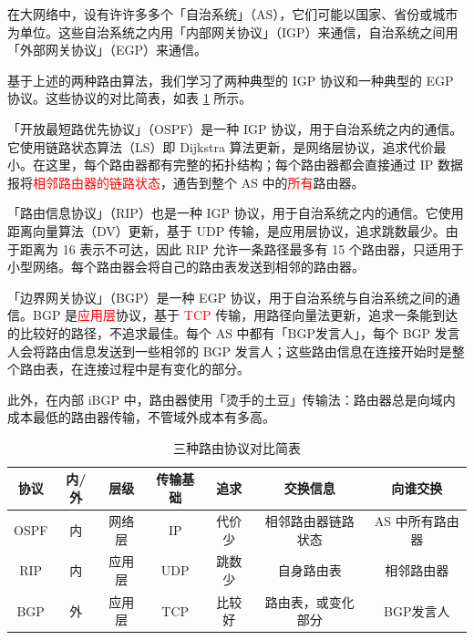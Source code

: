 \documentclass[UTF8]{ctexart}
\newcommand\Concept[1]{\textcolor{cyan!70!black}{#1}}
\begin{document}
在大网络中，设有许许多多个\Concept{「自治系统」（AS）}，它们可能以国家、省份或城市为单位。这些自治系统之内用\Concept{「内部网关协议」（IGP）}来通信，自治系统之间用\Concept{「外部网关协议」（EGP）}来通信。

基于上述的两种路由算法，我们学习了两种典型的 IGP 协议和一种典型的 EGP 协议。这些协议的对比简表，如表 \ref{tab:对比表} 所示。

\begin{description}[itemsep=0pt,parsep=0pt]
  \item[OSPF] \Concept{「开放最短路优先协议」（OSPF）}是一种 IGP 协议，用于自治系统之内的通信。它使用链路状态算法（LS）即 Dijkstra 算法更新，是网络层协议，追求代价最小。在这里，每个路由器都有完整的拓扑结构；每个路由器都会直接通过 IP 数据报将\textcolor{red}{相邻路由器的链路状态}，通告到整个 AS 中的\textcolor{red}{所有}路由器。
  \item[RIP] \Concept{「路由信息协议」（RIP）}也是一种 IGP 协议，用于自治系统之内的通信。它使用距离向量算法（DV）更新，基于 UDP 传输，是应用层协议，追求跳数最少。由于距离为 16 表示不可达，因此 RIP 允许一条路径最多有 15 个路由器，只适用于小型网络。每个路由器会将自己的路由表发送到相邻的路由器。
  \item[BGP] \Concept{「边界网关协议」（BGP）}是一种 EGP 协议，用于自治系统与自治系统之间的通信。BGP 是\textcolor{red}{应用层}协议，基于 \textcolor{red}{TCP} 传输，用路径向量法更新，追求一条能到达的比较好的路径，不追求最佳。每个 AS 中都有「BGP发言人」，每个 BGP 发言人会将路由信息发送到一些相邻的 BGP 发言人；这些路由信息在连接开始时是整个路由表，在连接过程中是有变化的部分。

      此外，在内部 iBGP 中，路由器使用「烫手的土豆」传输法：路由器总是向域内成本最低的路由器传输，不管域外成本有多高。
\end{description}

\begin{table}[htb]
\small
  \centering
  \begin{tabular}{ccccccc}
  \toprule
    协议 & 内/外 & 层级 & 传输基础 & 追求 & 交换信息 & 向谁交换 \\
  \midrule
    OSPF & 内 & 网络层 & IP & 代价少 & 相邻路由器链路状态 & AS 中所有路由器\\
    RIP & 内 & 应用层 & UDP & 跳数少 & 自身路由表 & 相邻路由器 \\
    BGP & 外 & 应用层 & TCP & 比较好 & 路由表，或变化部分 & BGP发言人\\
  \bottomrule
  \end{tabular}
  \caption{三种路由协议对比简表}\label{tab:对比表}
\end{table}
\end{document}
